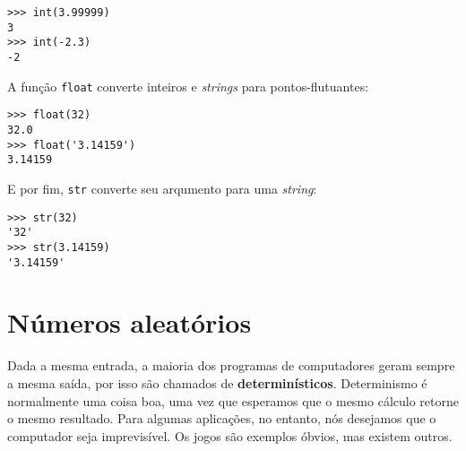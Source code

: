 \beforeverb
\begin{verbatim}
>>> int(3.99999)
3
>>> int(-2.3)
-2
\end{verbatim}
\afterverb
%
%
A função {\tt float} converte inteiros e {\it strings} para pontos-flutuantes:


\beforeverb
\begin{verbatim}
>>> float(32)
32.0
>>> float('3.14159')
3.14159
\end{verbatim}
\afterverb
%
%
E por fim, {\tt str} converte seu arqumento para uma {\it string}:


\beforeverb
\begin{verbatim}
>>> str(32)
'32'
>>> str(3.14159)
'3.14159'
\end{verbatim}
\afterverb
%

\section{Números aleatórios}



Dada a mesma entrada, a maioria dos programas de computadores geram sempre a
mesma saída, por isso são chamados de {\bf determinísticos}. Determinismo é
normalmente uma coisa boa, uma vez que esperamos que o mesmo cálculo retorne
o mesmo resultado. Para algumas aplicações, no entanto, nós desejamos que o
computador seja imprevisível. Os jogos são exemplos óbvios, mas existem outros.


